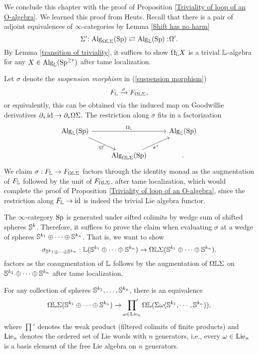 We conclude this chapter with the proof of Proposition \ref{Triviality of loop of an O-algebra}.
We learned this proof from Heuts. 
Recall that there is a pair of adjoint equivalences of $\infty$-categories by Lemma \ref{Shift has no harm} 
$$
\Sigma'\negmedspace: \operatorname{Alg}_{\Omega {\mathbb{L}} \Sigma}(\operatorname{Sp}) \rightleftarrows \operatorname{Alg}_{{\mathbb{L}}}(\operatorname{Sp}):\negmedspace \Omega'.
$$
By Lemma \ref{transition of triviality},
it suffices to show $\Omega_{{\mathbb{L}}} X$ is a trivial ${\mathbb{L}}$-algebra for any $X\in \operatorname{Alg}_{{\mathbb{L}}}(\operatorname{Sp}^{\geq r})$ after tame localization.

Let $\sigma$ denote the \emph{suspension morphism} in (\ref{suspension morphism})
\[
F_{{\mathbb{L}}} \xrightarrow{\sigma} F_{\Omega {\mathbb{L}} \Sigma},
\]
or equivalently, this can be obtained via the induced map on Goodwillie derivatives
$\partial_{*}\operatorname{id} \to \partial_* \Omega \Sigma$.
The restriction along $\sigma$ fits in a factorization
\[
\begin{tikzcd}
	\Alg_{\BL}(\Sp) &   & \Alg_{\BL}(\Sp) \\
	&  \Alg_{\Omega \BL \Sigma}(\Sp) &
	\arrow[from=1-1, to = 1-3, "\Omega_{\BL}"]
	\arrow[from=1-1 , to =2-2, "\Omega'" below]
	\arrow[from=2-2, to=1-3, "\sigma^*" below].
\end{tikzcd}
\]
We claim $\sigma:F_{{\mathbb{L}}}\to F_{\Omega {\mathbb{L}} \Sigma}$ factors through the identity monad as the augmentation of $F_{{\mathbb{L}}}$ followed by the unit of $F_{\Omega {\mathbb{L}} \Sigma}$, after tame localization, which would complete the proof of Proposition \ref{Triviality of loop of an O-algebra},
since the restriction along $F_{\mathbb{L}} \to \operatorname{id}$ is indeed the trivial Lie algebra functor. 

The $\infty$-category $\operatorname{Sp}$ is generated under sifted colimits by wedge sum of shifted spheres ${\mathbb{S}}^k$.
Therefore, it suffices to prove the claim when evaluating $\sigma$ at a wedge of spheres
${\mathbb{S}}^{k_1}\oplus \cdots \oplus {\mathbb{S}}^{k_n}$.
That is, we want to show 
$$
\sigma_{{\mathbb{S}}^{k_1}\oplus \cdots \oplus {\mathbb{S}}^{k_n}}: 
{\mathbb{L}}({\mathbb{S}}^{k_1}\oplus \cdots \oplus {\mathbb{S}}^{k_n})
\to 
\Omega {\mathbb{L}} \Sigma ({\mathbb{S}}^{k_1}\oplus \cdots \oplus {\mathbb{S}}^{k_n}).
$$
factors as the coaugmentation of ${\mathbb{L}}$ follows by the augmentation of $\Omega {\mathbb{L}} \Sigma$ on ${\mathbb{S}}^{k_1}\oplus \cdots \oplus {\mathbb{S}}^{k_n}$ after tame localization.
\begin{theorem}
    For any collection of spheres ${\mathbb{S}}^{k_1}, \dots, {\mathbb{S}}^{k_n}$, there is an equivalence
    $$
    \Omega{\mathbb{L}}\Sigma({\mathbb{S}}^{k_1}\oplus \cdots \oplus {\mathbb{S}}^{k_n})
    \to 
    \sideset{}{'}\prod_{\omega \in \operatorname{Lie}_n} \Omega {\mathbb{L}} (\Sigma \omega({\mathbb{S}}^{k_1 }, \cdots, {\mathbb{S}}^{k_n })),
    $$
    where $\prod'$ denotes the weak product (filtered colimits of finite products) and $\operatorname{Lie}_n$ denotes the ordered set of Lie words with $n$ generators, i.e., every $\omega\in \operatorname{Lie}_n$ is a basis element of the free Lie algebra on $n$ generators.
\end{theorem}

